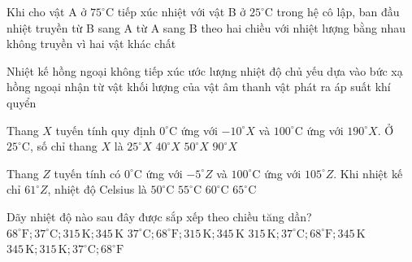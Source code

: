 \begin{ex}
Khi cho vật A ở $75^\circ\mathrm{C}$ tiếp xúc nhiệt với vật B ở $25^\circ\mathrm{C}$ trong hệ cô lập, ban đầu nhiệt truyền
\choice
{từ B sang A}
{\True từ A sang B}
{theo hai chiều với nhiệt lượng bằng nhau}
{không truyền vì hai vật khác chất}
\end{ex}

\begin{ex}
Nhiệt kế hồng ngoại không tiếp xúc ước lượng nhiệt độ chủ yếu dựa vào
\choice
{\True bức xạ hồng ngoại nhận từ vật}
{khối lượng của vật}
{âm thanh vật phát ra}
{áp suất khí quyển}
\end{ex}

\begin{ex}
Thang $X$ tuyến tính quy định $0^\circ\mathrm{C}$ ứng với $-10^\circ X$ và $100^\circ\mathrm{C}$ ứng với $190^\circ X$. Ở $25^\circ\mathrm{C}$, số chỉ thang $X$ là
\choice
{$25^\circ X$}
{\True $40^\circ X$}
{$50^\circ X$}
{$90^\circ X$}
\end{ex}

\begin{ex}
Thang $Z$ tuyến tính có $0^\circ\mathrm{C}$ ứng với $-5^\circ Z$ và $100^\circ\mathrm{C}$ ứng với $105^\circ Z$. Khi nhiệt kế chỉ $61^\circ Z$, nhiệt độ Celsius là
\choice
{$50^\circ\mathrm{C}$}
{$55^\circ\mathrm{C}$}
{\True $60^\circ\mathrm{C}$}
{$65^\circ\mathrm{C}$}
\end{ex}

\begin{ex}
Dãy nhiệt độ nào sau đây được sắp xếp theo chiều tăng dần?
\choice
{\True $68^\circ\mathrm{F}; 37^\circ\mathrm{C}; 315\,\mathrm{K}; 345\,\mathrm{K}$}
{$37^\circ\mathrm{C}; 68^\circ\mathrm{F}; 315\,\mathrm{K}; 345\,\mathrm{K}$}
{$315\,\mathrm{K}; 37^\circ\mathrm{C}; 68^\circ\mathrm{F}; 345\,\mathrm{K}$}
{$345\,\mathrm{K}; 315\,\mathrm{K}; 37^\circ\mathrm{C}; 68^\circ\mathrm{F}$}
\end{ex}

